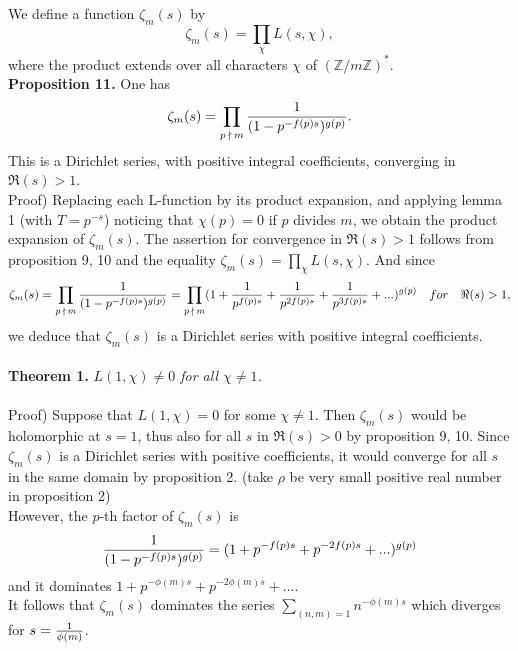 \documentclass[11pt]{article}
\begin{document}
We define a function $\zeta_m(s)$ by
\begin{equation*}
    \zeta_m(s)=\displaystyle\prod_{\chi} L(s,\chi),
\end{equation*}
where the product extends over all characters $\chi$ of $(\mathbb{Z}/m\mathbb{Z})^*$.
\vspace{7mm}
\\
\textbf{Proposition 11.}
One has \begin{equation*}
    \zeta_m(s)=\displaystyle\prod_{p\:\nmid\: m} {1\over (1-p^{-f(p)s} )^{g(p)}}.
\end{equation*}
This is a Dirichlet series, with positive integral coefficients, converging in $\Re(s)>1$.
\vspace{6mm}
\\
Proof) Replacing each L-function by its product expansion, and applying lemma 1 (with $T=p^{-s}$) noticing that $\chi(p)=0$ if $p$ divides $m$, we obtain the product expansion of $\zeta_m(s)$. The assertion for convergence in $\Re(s)>1$ follows from proposition 9, 10 and the equality $\zeta_m(s)=\displaystyle\prod_{\chi} L(s,\chi)$. And since
\begin{equation*}\zeta_m(s)=\displaystyle\prod_{p\:\nmid\: m} {1\over (1-p^{-f(p)s})^{g(p)}}=\displaystyle\prod_{p\:\nmid\: m}(1+{1\over p^{f(p)s}}+{1\over p^{2f(p)s}}+{1\over p^{3f(p)s}}+...)^{g(p)}\quad for\quad \Re(s)>1,
\end{equation*}
we deduce that $\zeta_m(s)$ is a Dirichlet series with positive integral coefficients.
\\
\\
\textbf{Theorem 1.} \textit{$L(1, \chi)\neq0$ for all $\chi\neq1$.} \\
\\
Proof) Suppose that $L(1, \chi)=0$ for some $\chi\neq1$. Then $\zeta_m(s)$ would be holomorphic at $s=1$, thus also for all $s$ in $\Re(s)>0$ by proposition 9, 10. Since $\zeta_m(s)$ is a Dirichlet series with positive coefficients, it would converge for all $s$ in the same domain by proposition 2. (take $\rho$ be very small positive real number in proposition 2) \\
However, the $p$-th factor of $\zeta_m(s)$ is
\begin{equation*}
{1\over (1-p^{-f(p)s})^{g(p)}}=(1+p^{-f(p)s}+p^{-2f(p)s}+...)^{g(p)}
\end{equation*}
and it dominates $1+p^{-\phi(m)s}+p^{-2\phi(m)s}+...$.\\
It follows that $\zeta_m(s)$ dominates the series $\displaystyle\sum_{(n, m)=1}n^{-\phi(m)s}$ which diverges for $s={1\over \phi(m)}$.
\vspace{2mm}
\end{document}
